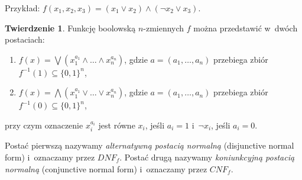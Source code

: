 \documentclass[a4paper,11pt,twoside]{article}
\theoremstyle{definition}
\newtheorem{tw}{Twierdzenie}
\begin{document}
\vspace{3cm}

Przykład: $f(x_1,x_2,x_3) = (x_1 \vee x_2) \wedge (\neg x_2 \vee x_3)$.
\begin{tw}
Funkcję boolowską $n$-zmiennych $f$ można przedstawić w~dwóch postaciach:
\begin{enumerate}
	\item $f(x) = \bigvee (x_1^{a_1} \wedge \dots \wedge x_n^{a_n})$, gdzie $a = (a_1, \dots,a_n)$ przebiega zbiór $f^{-1}(1) \subseteq \{0,1\}^n $,
	\item $f(x) = \bigwedge (x_1^{a_1} \vee \dots \vee x_n^{a_n})$, gdzie $a = (a_1, \dots,a_n)$ przebiega zbiór $f^{-1}(0) \subseteq \{0,1\}^n $,
\end{enumerate}
przy czym oznaczenie $x_i^{a_i}$ jest równe $x_i$, jeśli $a_i=1$ i~$\neg x_i$, jeśli $a_i=0$.
\end{tw}
Postać pierwszą nazywamy {\em alternatywną postacią normalną} (disjunctive normal form) i~oznaczamy przez $\mathit{DNF}_f$. Postać drugą nazywamy {\em koniunkcyjną postacią normalną} (conjunctive normal form) i~oznaczamy przez $\mathit{CNF}_f$.
\end{document}

